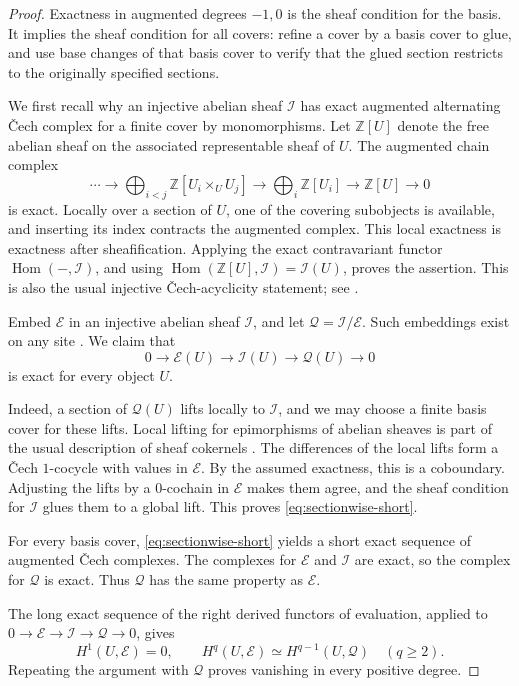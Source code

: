 \documentclass[11pt]{article}
\theoremstyle{definition}
\theoremstyle{remark}
\DeclareMathOperator{\Hom}{Hom}
\begin{document}
\begin{proof}
Exactness in augmented degrees \(-1,0\) is the sheaf condition
for the basis. It implies the sheaf condition for all covers:
refine a cover by a basis cover to glue, and use base changes of
that basis cover to verify that the glued section restricts to
the originally specified sections.

We first recall why an injective abelian sheaf \(\mathcal I\)
has exact augmented alternating \v{C}ech complex for a finite
cover by monomorphisms. Let \(\mathbb Z[U]\) denote the free
abelian sheaf on the associated representable sheaf of \(U\).
The augmented chain complex
\[
\cdots\longrightarrow
\bigoplus_{i<j}\mathbb Z[U_i\times_U U_j]
\longrightarrow
\bigoplus_i\mathbb Z[U_i]
\longrightarrow \mathbb Z[U]\longrightarrow0
\]
is exact. Locally over a section of \(U\), one of the covering
subobjects is available, and inserting its index contracts the
augmented complex. This local exactness is exactness after
sheafification. Applying the exact contravariant functor
\(\Hom(-,\mathcal I)\), and using
\(\Hom(\mathbb Z[U],\mathcal I)=\mathcal I(U)\), proves the
assertion. This is also the usual injective \v{C}ech-acyclicity
statement; see \cite[Tag~03AW]{Stacks}.

Embed \(\mathcal E\) in an injective abelian sheaf \(\mathcal I\),
and let \(\mathcal Q=\mathcal I/\mathcal E\).
Such embeddings exist on any site
\cite[Tag~01DP]{Stacks}.
We claim that
\begin{equation}\label{eq:sectionwise-short}
0\longrightarrow\mathcal E(U)\longrightarrow\mathcal I(U)
\longrightarrow\mathcal Q(U)\longrightarrow0
\end{equation}
is exact for every object \(U\).

Indeed, a section of \(\mathcal Q(U)\) lifts locally to
\(\mathcal I\), and we may choose a finite basis cover for these
lifts. Local lifting for epimorphisms of abelian sheaves is part
of the usual description of sheaf cokernels
\cite[Tag~03CM]{Stacks}.
The differences of the local lifts form a \v{C}ech \(1\)-cocycle
with values in \(\mathcal E\). By the assumed exactness, this is a
coboundary. Adjusting the lifts by a \(0\)-cochain in
\(\mathcal E\) makes them agree, and the sheaf condition for
\(\mathcal I\) glues them to a global lift. This proves
\eqref{eq:sectionwise-short}.

For every basis cover, \eqref{eq:sectionwise-short} yields a
short exact sequence of augmented \v{C}ech complexes. The
complexes for \(\mathcal E\) and \(\mathcal I\) are exact, so the
complex for \(\mathcal Q\) is exact. Thus \(\mathcal Q\) has the
same property as \(\mathcal E\).

The long exact sequence of the right derived functors of
evaluation, applied to
\(0\to\mathcal E\to\mathcal I\to\mathcal Q\to0\), gives
\[
H^1(U,\mathcal E)=0,\qquad
H^q(U,\mathcal E)\simeq H^{q-1}(U,\mathcal Q)\quad(q\ge2).
\]
Repeating the argument with \(\mathcal Q\) proves vanishing in
every positive degree.
\end{proof}
\end{document}
